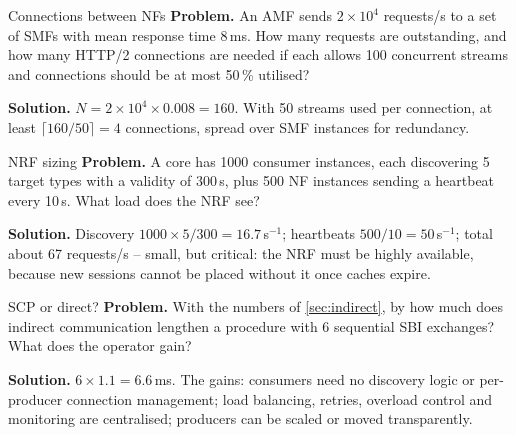 \documentclass[11pt,a4paper]{article}
\begin{document}
\begin{examplebox}{Connections between NFs}\label{ex:inflight}
\textbf{Problem.} An AMF sends $2\times10^4$ requests/s to a set of SMFs with mean response time 8\,ms. How many requests are
outstanding, and how many HTTP/2 connections are needed if each allows 100 concurrent streams and connections should be at most
50\,\% utilised?

\textbf{Solution.} $N = 2\times10^4\times0.008 = 160$. With 50 streams used per connection, at least $\lceil160/50\rceil = 4$ connections,
spread over SMF instances for redundancy.
\end{examplebox}

\begin{examplebox}{NRF sizing}\label{ex:cache}
\textbf{Problem.} A core has 1000 consumer instances, each discovering 5 target types with a validity of 300\,s, plus 500 NF instances
sending a heartbeat every 10\,s. What load does the NRF see?

\textbf{Solution.} Discovery $1000\times5/300 = 16.7$\,s$^{-1}$; heartbeats $500/10 = 50$\,s$^{-1}$; total about 67 requests/s --
small, but critical: the NRF must be highly available, because new sessions cannot be placed without it once caches expire.
\end{examplebox}

\begin{examplebox}{SCP or direct?}\label{ex:scp}
\textbf{Problem.} With the numbers of \cref{sec:indirect}, by how much does indirect communication lengthen a procedure with 6
sequential SBI exchanges? What does the operator gain?

\textbf{Solution.} $6\times1.1 = 6.6$\,ms. The gains: consumers need no discovery logic or per-producer connection management; load
balancing, retries, overload control and monitoring are centralised; producers can be scaled or moved transparently.
\end{examplebox}

\end{document}
